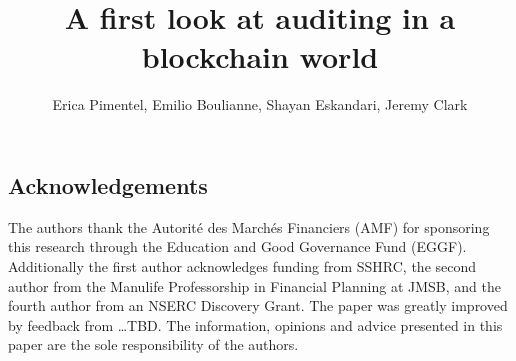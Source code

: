 \documentclass[envcountsect]{llncs}
\begin{document}
\frontmatter
\mainmatter

\title{\Large \bf A first look at auditing in a blockchain world}

\author{
	Erica Pimentel,
	Emilio Boulianne,
	Shayan Eskandari,
	Jeremy Clark
	}


\maketitle










\subsection*{Acknowledgements}

The authors thank the Autorit\'e des March\'es Financiers (AMF) for sponsoring this research through the Education and Good Governance Fund (EGGF). Additionally the first author acknowledges funding from SSHRC, the second author from the Manulife Professorship in Financial Planning at JMSB, and the fourth author from an NSERC Discovery Grant. The paper was greatly improved by feedback from \ldots TBD. The information, opinions and advice presented in this paper are the sole responsibility of the authors.





\clearpage
\appendix
\end{document}
